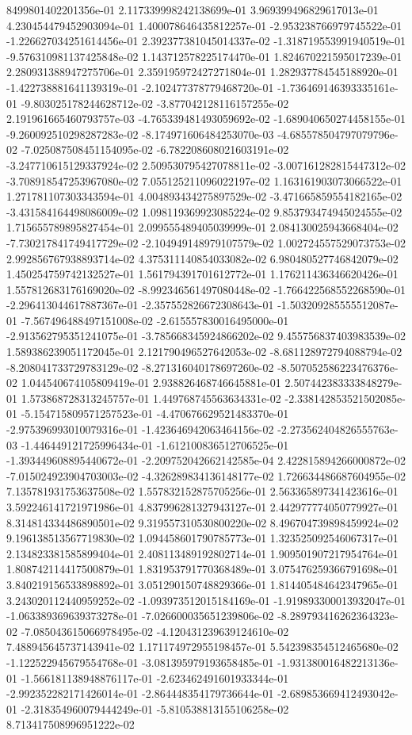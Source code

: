 8499801402201356e-01	2.117339998242138699e-01	3.969399496829617013e-01	4.230454479452903094e-01	1.400078646435812257e-01	-2.953238766979745522e-01	-1.226627034251614456e-01	2.392377381045014337e-02	-1.318719553991940519e-01	-9.576310981137425848e-02	1.143712578225174470e-01	1.824670221595017239e-01	2.280931388947275706e-01	2.359195972427271804e-01	1.282937784545188920e-01	-1.422738881641139319e-01	-2.102477378779468720e-01	-1.736469146393335161e-01	-9.803025178244628712e-02	-3.877042128116157255e-02	2.191961665460793757e-03	-4.765339481493059692e-02	-1.689040650274458155e-01	-9.260092510298287283e-02	-8.174971606484253070e-03	-4.685578504797079796e-02	-7.025087508451154095e-02	-6.782208608021603191e-02	-3.247710615129337924e-02	2.509530795427078811e-02	-3.007161282815447312e-02	-3.708918547253967080e-02	7.055125211096022197e-02	1.163161903073066522e-01	1.271781107303343594e-01	4.004893434275897529e-02	-3.471665859554182165e-02	-3.431584164498086009e-02	1.098119369923085224e-02	9.853793474945024555e-02	1.715655789895827454e-01	2.099555489405039999e-01	2.084130025943668404e-02	-7.730217841749417729e-02	-2.104949148979107579e-02	1.002724557529073753e-02	2.992856767938893714e-02	4.375311140854033082e-02	6.980480527746842079e-02	1.450254759742132527e-01	1.561794391701612772e-01	1.176211436346620426e-01	1.557812683176169020e-02	-8.992346561497080448e-02	-1.766422568552268590e-01	-2.296413044617887367e-01	-2.357552826672308643e-01	-1.503209285555512087e-01	-7.567496488497151008e-02	-2.615557830016495000e-01	-2.913562795351241075e-01	-3.785668345924866202e-02	9.455756837403983539e-02	1.589386239051172045e-01	2.121790496527642053e-02	-8.681128972794088794e-02	-8.208041733729783129e-02	-8.271316040178697260e-02	-8.507052586223476376e-02	1.044540674105809419e-01	2.938826468746645881e-01	2.507442383333848279e-01	1.573868728313245757e-01	1.449768745563634331e-02	-2.338142853521502085e-01	-5.154715809571257523e-01	-4.470676629521483370e-01	-2.975396993010079316e-01	-1.423646942063464156e-02	-2.273562404826555763e-03	-1.446449121725996434e-01	-1.612100836512706525e-01	-1.393449608895440672e-01	-2.209752042662142585e-04	2.422815894266000872e-02	-7.015024923904703003e-02	-4.326289834136148177e-02	1.726634486687604955e-02	7.135781931753637508e-02	1.557832152875705256e-01	2.563365897341423616e-01	3.592246141721971986e-01	4.837996281327943127e-01	2.442977774050779927e-01	8.314814334486890501e-02	9.319557310530800220e-02	8.496704739898459924e-02	9.196138513567719830e-02	1.094458601790785773e-01	1.323525092546067317e-01	2.134823381585899404e-01	2.408113489192802714e-01	1.909501907217954764e-01	1.808742114417500879e-01	1.831953791770368489e-01	3.075476259366791698e-01	3.840219156533898892e-01	3.051290150748829366e-01	1.814405484642347965e-01	3.243020112440959252e-02	-1.093973512015184169e-01	-1.919893300013932047e-01	-1.063389369639373278e-01	-7.026600035651239806e-02	-8.289793416262364323e-02	-7.085043615066978495e-02	-4.120431239639124610e-02	7.488945645737143941e-02	1.171174972955198457e-01	5.542398354512465680e-02	-1.122522945679554768e-01	-3.081395979193658485e-01	-1.931380016482213136e-01	-1.566181138948876117e-01	-2.623462491601933344e-01	-2.992352282171426014e-01	-2.864448354179736644e-01	-2.689853669412493042e-01	-2.318354960079444249e-01	-5.810538813155106258e-02	8.713417508996951222e-02	
